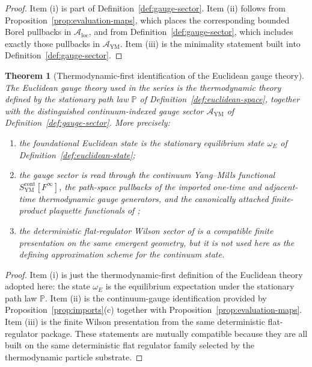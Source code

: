 \documentclass[11pt]{article}
\newtheorem{theorem}{Theorem}[section]
\theoremstyle{definition}
\theoremstyle{remark}
\newcommand{\mcA}{\mathcal A}
\begin{document}
\begin{proof}
Item \textnormal{(i)} is part of Definition~\ref{def:gauge-sector}.  Item
\textnormal{(ii)} follows from Proposition~\ref{prop:evaluation-maps}, which
places the corresponding bounded Borel pullbacks in \(\mcA_{\mathrm{loc}}\),
and from Definition~\ref{def:gauge-sector}, which includes exactly those
pullbacks in \(\mcA_{\mathrm{YM}}\).  Item \textnormal{(iii)} is the minimality
statement built into Definition~\ref{def:gauge-sector}.
\end{proof}

\begin{theorem}[Thermodynamic-first identification of the Euclidean gauge theory]
\label{thm:gauge-identification}
The Euclidean gauge theory used in the series is the thermodynamic
theory defined by the stationary path law \(\mathbb P\) of
Definition~\ref{def:euclidean-space}, together with the distinguished
continuum-indexed gauge sector \(\mcA_{\mathrm{YM}}\) of
Definition~\ref{def:gauge-sector}.  More precisely:
\begin{enumerate}[label=\textnormal{(\roman*)},leftmargin=1.5em]
\item the foundational Euclidean state is the stationary equilibrium state
\(\omega_E\) of Definition~\ref{def:euclidean-state};
\item the gauge sector is read through the continuum Yang--Mills functional
\(S_{\mathrm{YM}}^{\mathrm{cont}}[F^\infty]\), the path-space pullbacks of the
imported one-time and adjacent-time thermodynamic gauge generators, and the
canonically attached finite-product plaquette functionals of
\cite{continuumqft};
\item the deterministic flat-regulator Wilson sector of \cite{continuumqft} is
a compatible finite presentation on the same emergent geometry, but it is not
used here as the defining approximation scheme for the continuum state.
\end{enumerate}
\end{theorem}

\begin{proof}
Item \textnormal{(i)} is just the thermodynamic-first definition of the
Euclidean theory adopted here: the state \(\omega_E\) is the
equilibrium expectation under the stationary path law \(\mathbb P\).
Item \textnormal{(ii)} is the continuum-gauge identification provided by
Proposition~\ref{prop:imports}\textnormal{(c)} together with
Proposition~\ref{prop:evaluation-maps}.  Item \textnormal{(iii)} is the finite
Wilson presentation from the same deterministic flat-regulator package.  These
statements are mutually compatible because they are all built on the same
deterministic flat regulator family selected by the thermodynamic particle
substrate.
\end{proof}
\end{document}
